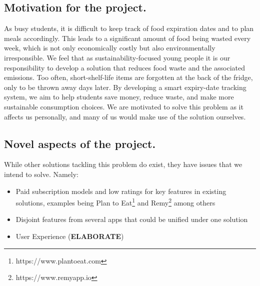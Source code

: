 \subsection{Motivation for the project.}
As busy students, it is difficult to keep track of food expiration dates and to plan meals accordingly. This leads to a significant amount of food being wasted every week, which is not only economically costly but also environmentally irresponsible. We feel that as sustainability-focused young people it is our responsibility to develop a solution that reduces food waste and the associated emissions. Too often, short-shelf-life items are forgotten at the back of the fridge, only to be thrown away days later. By developing a smart expiry-date tracking system, we aim to help students save money, reduce waste, and make more sustainable consumption choices. We are motivated to solve this problem as it affects us personally, and many of us would make use of the solution ourselves. 
\par

\subsection{Novel aspects of the project. }
While other solutions tackling this problem do exist, they have issues that we intend to solve. Namely:
\begin{itemize}
    \item Paid subscription models and low ratings for key features in existing solutions, examples being Plan to Eat\footnote{https://www.plantoeat.com} and Remy\footnote{https://www.remyapp.io} among others 
    \item Disjoint features from several apps that could be unified under one solution
    \item User Experience (\textbf{ELABORATE})
\end{itemize}